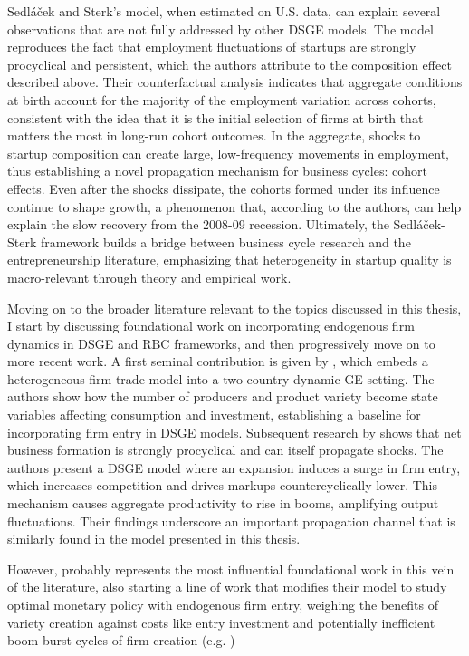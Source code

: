 \documentclass[a4paper,12pt]{article} %
\numberwithin{equation}{section} %
\numberwithin{figure}{section}
\numberwithin{table}{section}
\begin{document}
Sedláček and Sterk’s model, when estimated on U.S. data, can explain several observations that are not fully addressed by other DSGE models. The model reproduces the fact that employment fluctuations of startups are strongly procyclical and persistent, which the authors attribute to the composition effect described above. Their counterfactual analysis indicates that aggregate conditions at birth account for the majority of the employment variation across cohorts, consistent with the idea that it is the initial selection of firms at birth that matters the most in long-run cohort outcomes. In the aggregate, shocks to startup composition can create large, low-frequency movements in employment, thus establishing a novel propagation mechanism for business cycles: cohort effects. Even after the shocks dissipate, the cohorts formed under its influence continue to shape growth, a phenomenon that, according to the authors, can help explain the slow recovery from the 2008-09 recession. Ultimately, the Sedláček-Sterk framework builds a bridge between business cycle research and the entrepreneurship literature, emphasizing that heterogeneity in startup quality is macro-relevant through theory and empirical work.

Moving on to the broader literature relevant to the topics discussed in this thesis, I start by discussing foundational work on incorporating endogenous firm dynamics in DSGE and RBC frameworks, and then progressively move on to more recent work. A first seminal contribution is given by \textcite{ghironi2007trade}, which embeds a heterogeneous-firm trade model into a two-country dynamic GE setting. The authors show how the number of producers and product variety become state variables affecting consumption and investment, establishing a baseline for incorporating firm entry in DSGE models. Subsequent research by \textcite{jaimovich2008firm} shows that net business formation is strongly procyclical and can itself propagate shocks. The authors present a DSGE model where an expansion induces a surge in firm entry, which increases competition and drives markups countercyclically lower. This mechanism causes aggregate productivity to rise in booms, amplifying output fluctuations. Their findings underscore an important propagation channel that is similarly found in the model presented in this thesis.

 However, \textcite{bilbiie2012endogenous} probably represents the most influential foundational work in this vein of the literature, also starting a line of work that modifies their model to study optimal monetary policy with endogenous firm entry, weighing the benefits of variety creation against costs like entry investment and potentially inefficient boom-burst cycles of firm creation (e.g. \textcite{bilbiie2014optimal, lewis2012firm})
\end{document}
